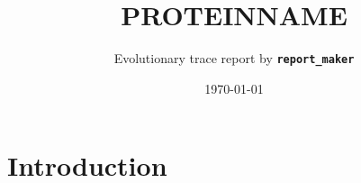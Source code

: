 \documentclass{reportmaker}
\begin{document}
   

\title[PROTEINNAME]{\bf PROTEINNAME}
\author [ET report]{ Evolutionary trace report by {\tt \bf report\_maker}}
\address{Ivana Mihalek 2006}
\date{\today}
\maketitle


\tableofcontents

\section{Introduction}
\end{document}
